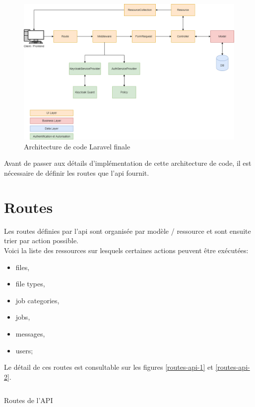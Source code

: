 \documentclass[
    iai, %
    il, %
]{heig-tb}
\begin{document}
\begin{center}
    \begin{figure}
        \includegraphics[width=\textwidth]{./assets/figures/architecture-code-finale.drawio.png}
        \caption{Architecture de code Laravel finale \label{architecture-code-finale}}
    \end{figure}
\end{center}

Avant de passer aux détails d'implémentation de cette architecture de code, il est nécessaire de définir les routes que l'\Gls{api} fournit.

\section{Routes}
Les routes définies par l'\Gls{api} sont organisée par modèle / ressource et sont ensuite trier par action possible. \\
Voici la liste des ressources sur lesquels certaines actions peuvent être exécutées:
\begin{itemize}
    \item files,
    \item file types,
    \item job categories,
    \item jobs,
    \item messages,
    \item users;
\end{itemize}

Le détail de ces routes est consultable sur les figures \ref{routes-api-1} et \ref{routes-api-2}.
\begin{listing}[h]
    \inputminted{php}{assets/code/api-1.php}
    \caption{Routes de l'API \label{routes-api-2}}
\end{listing}
\end{document}
